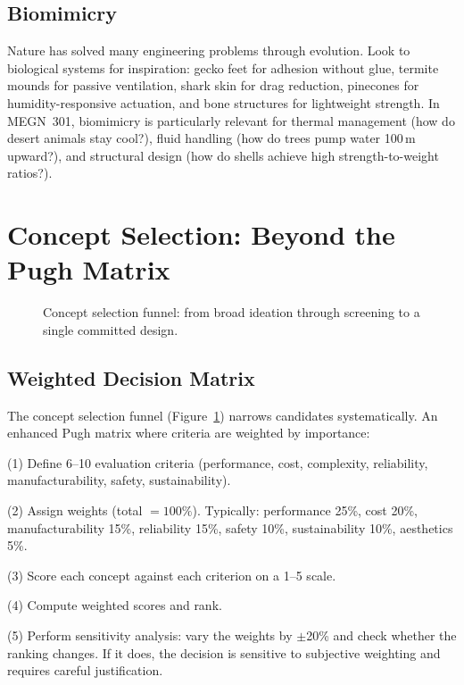 \subsection{Biomimicry}
Nature has solved many engineering problems through evolution. Look to biological systems for inspiration: gecko feet for adhesion without glue, termite mounds for passive ventilation, shark skin for drag reduction, pinecones for humidity-responsive actuation, and bone structures for lightweight strength. In MEGN~301, biomimicry is particularly relevant for thermal management (how do desert animals stay cool?), fluid handling (how do trees pump water 100\,m upward?), and structural design (how do shells achieve high strength-to-weight ratios?).

\section{Concept Selection: Beyond the Pugh Matrix}

\begin{figure}[htbp]\centering

\caption{Concept selection funnel: from broad ideation through screening to a single committed design.}\label{fig:selection_funnel}\end{figure}

\subsection{Weighted Decision Matrix}
The concept selection funnel (Figure~\ref{fig:selection_funnel}) narrows candidates systematically. An enhanced Pugh matrix where criteria are weighted by importance:

(1) Define 6--10 evaluation criteria (performance, cost, complexity, reliability, manufacturability, safety, sustainability).

(2) Assign weights (total $= 100\%$). Typically: performance 25\%, cost 20\%, manufacturability 15\%, reliability 15\%, safety 10\%, sustainability 10\%, aesthetics 5\%.

(3) Score each concept against each criterion on a 1--5 scale.

(4) Compute weighted scores and rank.

(5) Perform sensitivity analysis: vary the weights by $\pm$20\% and check whether the ranking changes. If it does, the decision is sensitive to subjective weighting and requires careful justification.

